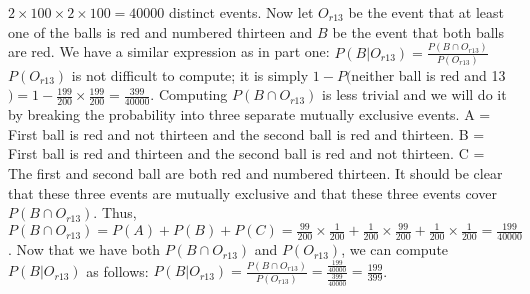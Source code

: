 \documentclass[12pt]{article}
\begin{document}
$2\times 100 \times 2 \times 100 = 40000$ distinct events.
\newline
\newline
Now let $O_{r13}$ be the event that at least one of the balls is red and numbered thirteen and $B$ be the event that
both balls are red. We have a similar expression as in part one:
\newline
\newline
$P(B | O_{r13}) = \frac{P(B \cap O_{r13})}{P(O_{r13})}$
\newline
\newline
$P(O_{r13})$ is not difficult to compute; it is simply $1 - P($neither ball is red and 13$) 
= 1 - \frac{199}{200} \times \frac{199}{200} = \frac{399}{40000}$. Computing $P(B \cap O_{r13})$
is less trivial and we will do it by breaking the probability into three separate mutually exclusive events. 
\newline
\newline
A = First ball is red and not thirteen and the second ball is red and thirteen.
\newline
B = First ball is red and thirteen and the second ball is red and not thirteen.
\newline
C = The first and second ball are both red and numbered thirteen.
\newline
\newline
It should be clear that these three events are mutually exclusive and that these
three events cover $P(B \cap O_{r13})$.
Thus, $P(B \cap O_{r13}) = P(A) + P(B) + P(C) 
= \frac{99}{200}\times \frac{1}{200} + \frac{1}{200}\times \frac{99}{200} + 
\frac{1}{200} \times \frac{1}{200} = \frac{199}{40000}$. Now that we have both
$P(B \cap O_{r13})$ and $P(O_{r13})$, we can compute $P(B | O_{r13})$ as follows:
\newline
\newline
$P(B | O_{r13}) = \frac{P(B \cap O_{r13})}{P(O_{r13})} = \frac{\frac{199}{40000}}{\frac{399}{40000}}
= \frac{199}{399}$.
\end{document}
